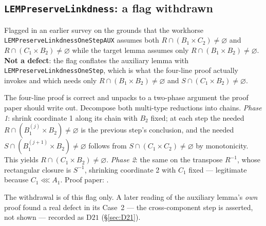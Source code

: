 \subsection{\texttt{LEMPreserveLinkdness}: a flag withdrawn}\label{sec:exp-preserve}

Flagged in an earlier survey on the grounds that the workhorse
\texttt{LEMPreserve\brk Linkdness\brk OneStepAUX} assumes both
$R\cap(B_{1}\times C_{2})\neq\varnothing$ and $R\cap(C_{1}\times B_{2})\neq
\varnothing$ while the target lemma assumes only $R\cap(B_{1}\times B_{2})\neq
\varnothing$. \textbf{Not a defect}: the flag conflates the auxiliary lemma
with \texttt{LEMPreserveLinkdnessOneStep}, which is what the four-line proof
actually invokes and which needs only $R\cap(B_{1}\times B_{2})\neq\varnothing$
and $S\cap(C_{1}\times B_{2})\neq\varnothing$.

The four-line proof is correct and unpacks to a two-phase argument the proof
paper should write out. Decompose both multi-type reductions into chains.
\emph{Phase 1}: shrink coordinate 1 along its chain with $B_{2}$ fixed; at each
step the needed $R\cap(B_{1}^{(j)}\times B_{2})\neq\varnothing$ is the previous
step's conclusion, and the needed $S\cap(B_{1}^{(j+1)}\times B_{2})\neq
\varnothing$ follows from $S\cap(C_{1}\times C_{2})\neq\varnothing$ by
monotonicity. This yields $R\cap(C_{1}\times B_{2})\neq\varnothing$.
\emph{Phase 2}: the same on the transpose $R^{-1}$, whose rectangular closure
is $S^{-1}$, shrinking coordinate 2 with $C_{1}$ fixed --- legitimate because
$C_{1}\lll A_{1}$. Proof paper: .

The withdrawal is of this flag only. A later reading of the auxiliary
lemma's \emph{own} proof found a real defect in its Case~2 --- the
cross-component step is asserted, not shown --- recorded as
$\mathrm D21$ (\S\ref{sec:D21}).
